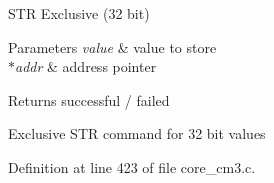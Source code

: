 S\-T\-R Exclusive (32 bit) 


\begin{DoxyParams}{Parameters}
{\em value} & value to store \\
\hline
{\em $\ast$addr} & address pointer \\
\hline
\end{DoxyParams}
\begin{DoxyReturn}{Returns}
successful / failed
\end{DoxyReturn}
Exclusive S\-T\-R command for 32 bit values 

Definition at line 423 of file core\-\_\-cm3.\-c.


